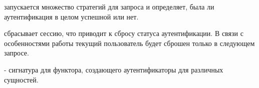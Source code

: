 \begin{ocamlindent}
\medbreak
\label{page-FPauth-core-module-FPauth+u+core-module-Auth+u+sign-module-type-AUTHENTICATOR-val-authenticate}\begin{ocamlindent} запускается множество стратегий для запроса и определяет, была ли аутентификация в целом успешной или нет.\end{ocamlindent}%
\medbreak
\label{page-FPauth-core-module-FPauth+u+core-module-Auth+u+sign-module-type-AUTHENTICATOR-val-logout}\begin{ocamlindent} сбрасывает сессию, что приводит к сбросу статуса аутентификации. В связи с особенностями работы  текущий пользователь будет сброшен только в следующем запросе.\end{ocamlindent}%
\medbreak
\end{ocamlindent}%
\begin{ocamlindent} - сигнатура для функтора, создающего аутентификаторы для различных сущностей.\end{ocamlindent}%
\medbreak
